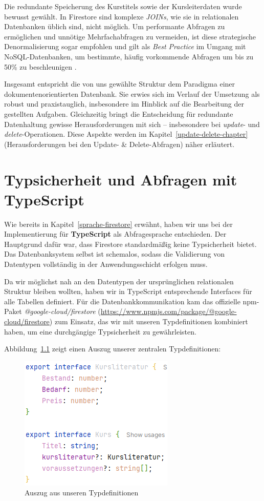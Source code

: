 \documentclass[12pt,a4paper%
              ,oneside     %
              ,titlepage
              ,DIV=13
              ,headinclude
              ,footinclude=false%
              ,cleardoublepage=empty%
              ,parskip=half,
              BCOR=0mm,
              ]{scrreprt}
\begin{document}
Die redundante Speicherung des Kurstitels sowie der Kursleiterdaten wurde bewusst gewählt. In Firestore sind komplexe \textit{JOINs}, wie sie in relationalen Datenbanken üblich sind, nicht möglich. Um performante Abfragen zu ermöglichen und unnötige Mehrfachabfragen zu vermeiden, ist diese strategische Denormalisierung sogar empfohlen und gilt als \textit{Best Practice} im Umgang mit NoSQL-Datenbanken, um bestimmte, häufig vorkommende Abfragen um bis zu 50\% zu beschleunigen \cite{Estuary.2025, MoldStud.2025}.

Insgesamt entspricht die von uns gewählte Struktur dem Paradigma einer dokumentenorientierten Datenbank. Sie erwies sich im Verlauf der Umsetzung als robust und praxistauglich, insbesondere im Hinblick auf die Bearbeitung der gestellten Aufgaben. Gleichzeitig bringt die Entscheidung für redundante Datenhaltung gewisse Herausforderungen mit sich – insbesondere bei \textit{update}- und \textit{delete}-Operationen. Diese Aspekte werden im Kapitel~\ref{update-delete-chapter} (\glqq Herausforderungen bei den Update- \& Delete-Abfragen\grqq{}) näher erläutert.

\chapter{Typsicherheit und Abfragen mit TypeScript}
\label{typ-sicherheit-chapter}

Wie bereits in Kapitel~\ref{sprache-firestore} erwähnt, haben wir uns bei der Implementierung für \textbf{TypeScript} als Abfragesprache entschieden. Der Hauptgrund dafür war, dass Firestore standardmäßig keine Typsicherheit bietet. Das Datenbanksystem selbst ist schemalos, sodass die Validierung von Datentypen vollständig in der Anwendungsschicht erfolgen muss.

Da wir möglichst nah an den Datentypen der ursprünglichen relationalen Struktur bleiben wollten, haben wir in TypeScript entsprechende Interfaces für alle Tabellen definiert. Für die Datenbankkommunikation kam das offizielle npm-Paket \textit{@google-cloud/firestore} (\url{https://www.npmjs.com/package/@google-cloud/firestore}) zum Einsatz, das wir mit unseren Typdefinitionen kombiniert haben, um eine durchgängige Typsicherheit zu gewährleisten.

Abbildung~\ref{fig:types} zeigt einen Auszug unserer zentralen Typdefinitionen:

\begin{figure}[H]
	\centering
	\includegraphics{img/types.png}
	\caption{Auszug aus unseren Typdefinitionen}
	\label{fig:types}
\end{figure}
\end{document}
